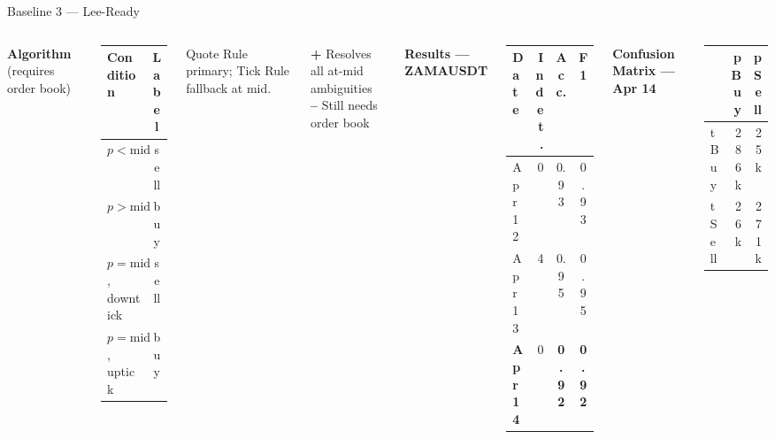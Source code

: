 \documentclass[aspectratio=169,10pt]{beamer}
\begin{document}
\begin{frame}{Baseline 3 — Lee-Ready}
  \begin{columns}[T]
    \textbf{Algorithm} (requires order book)
    \begin{center}
    \begin{tabular}{lc}
      \toprule
      Condition & Label \\
      \midrule
      $p < \text{mid}$             & sell \\
      $p > \text{mid}$             & buy  \\
      $p = \text{mid}$, downtick   & sell \\
      $p = \text{mid}$, uptick     & buy  \\
      \bottomrule
    \end{tabular}
    \end{center}
    Quote Rule primary; Tick Rule fallback at mid.

    \medskip
    \textcolor{okgreen}{\textbf{+}} Resolves all at-mid ambiguities\\
    \textcolor{badred}{\textbf{--}} Still needs order book

    \textbf{Results — ZAMAUSDT}
    \begin{center}
    \begin{tabular}{lrcc}
      \toprule
      Date & Indet. & Acc. & F1 \\
      \midrule
      Apr 12 & 0 & 0.93 & 0.93 \\
      Apr 13 & 4 & 0.95 & 0.95 \\
      \textbf{Apr 14} & 0 & \textbf{0.92} & \textbf{0.92} \\
      \bottomrule
    \end{tabular}
    \end{center}
    \medskip
    \textbf{Confusion Matrix — Apr 14}
    \begin{center}
    \small
    \begin{tabular}{lrr}
      \toprule
       & pBuy & pSell \\
      \midrule
      tBuy  & 286k & 25k \\
      tSell & 26k  & 271k \\
      \bottomrule
    \end{tabular}
    \end{center}
  \end{columns}
\end{frame}
\end{document}
